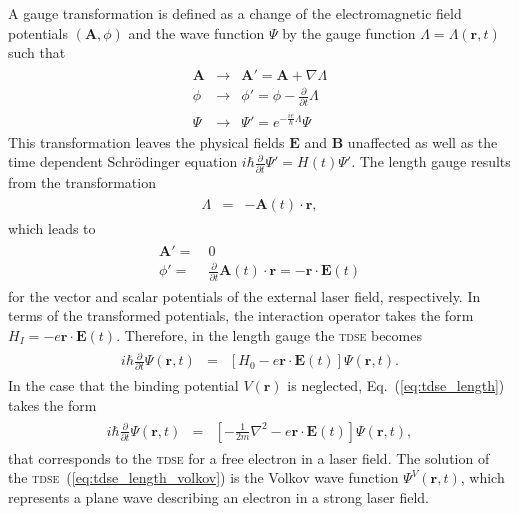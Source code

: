 A gauge transformation is defined as a change of the electromagnetic
field potentials $(\mathbf{A}, \phi)$ and the wave function $\Psi$ by
the gauge function $\Lambda = \Lambda(\mathbf{r},t)$ such that
%
\begin{eqnarray}
  \label{eq:gauge}
  \begin{split}
    \mathbf{A} & \to & \mathbf{A}' = \mathbf{A} + \nabla\Lambda \\
    \phi & \to & \phi' = \phi - \frac{\partial}{\partial t}\Lambda \\
    \Psi & \to & \Psi' = e^{-\frac{ie}{\hbar} \Lambda} \Psi
  \end{split}
\end{eqnarray}
%
This transformation leaves the physical fields $\mathbf{E}$ and
$\mathbf{B}$ unaffected as well as the time dependent Schr\"{o}dinger
equation $i \hbar \frac{\partial}{\partial t}\Psi' = H(t) \Psi'$. The
length gauge results from the transformation
%
\begin{eqnarray}
  \label{eq:length_gauge}
  \begin{split}
    \Lambda & = & -\mathbf{A}(t) \cdot \mathbf{r},
  \end{split}
\end{eqnarray}
%
which leads to
%
\begin{eqnarray}
  \label{eq:A_length}
  \begin{split}
    \mathbf{A}' = &\ 0 \\
    \phi' = &\ \frac{\partial}{\partial t}
    \mathbf{A}(t) \cdot \mathbf{r} = -\mathbf{r} \cdot \mathbf{E}(t) 
  \end{split}
\end{eqnarray}
for the vector and scalar potentials of the external laser field,
respectively. In terms of the transformed potentials, the interaction
operator takes the form $H_{I} = -e \mathbf{r} \cdot \mathbf{E}(t)$.
Therefore, in the length gauge the \textsc{tdse} becomes
%
\begin{eqnarray}
  \label{eq:tdse_length}
  \begin{split}
    i \hbar \frac{\partial}{\partial t} \Psi(\mathbf{r}, t) & = &
    \left[H_{0} -
      e\mathbf{r}\cdot\mathbf{E}(t) \right] \Psi(\mathbf{r}, t).
  \end{split}
\end{eqnarray}
%
In the case that the binding potential $V(\mathbf{r})$ is neglected,
Eq.~(\ref{eq:tdse_length}) takes the form
%
\begin{eqnarray}
  \label{eq:tdse_length_volkov}
  \begin{split}
    i \hbar \frac{\partial}{\partial t} \Psi(\mathbf{r}, t) & = &
    \left[-\frac{1}{2m} \nabla^{2} -
      e\mathbf{r}\cdot\mathbf{E}(t) \right] \Psi(\mathbf{r}, t),
  \end{split}
\end{eqnarray}
%
that corresponds to the \textsc{tdse} for a free electron in a laser
field. The solution of the \textsc{tdse}~(\ref{eq:tdse_length_volkov})
is the Volkov wave function $\Psi^{V}(\mathbf{r}, t)$, which
represents a plane wave describing an electron in a strong laser
field.


